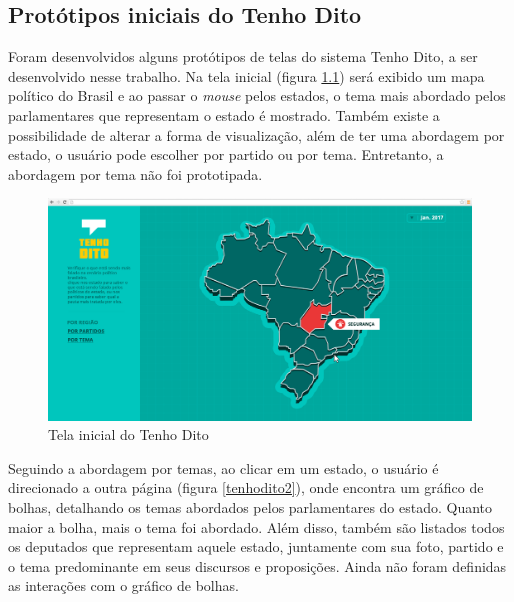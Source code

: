 \begin{apendicesenv}

\partapendices

\chapter{Protótipos iniciais do Tenho Dito}
\label{prototipos-apendice}

Foram desenvolvidos alguns protótipos de telas do sistema Tenho Dito, a ser desenvolvido nesse trabalho. Na tela inicial (figura \ref{tenhodito1}) será exibido um mapa político do Brasil e ao passar o \textit{mouse} pelos estados, o tema mais abordado pelos parlamentares que representam o estado é mostrado. Também existe a possibilidade de alterar a forma de visualização, além de ter uma abordagem por estado, o usuário pode escolher por partido ou por tema. Entretanto, a abordagem por tema não foi prototipada.

\begin{figure}[h]
  \centering
  \includegraphics[scale=0.2]{figuras/tenhodito1.eps}
  \caption{Tela inicial do Tenho Dito}
  \label{tenhodito1}
\end{figure}

Seguindo a abordagem por temas, ao clicar em um estado, o usuário é direcionado a outra página (figura \ref{tenhodito2}), onde encontra um gráfico de bolhas, detalhando os temas abordados pelos parlamentares do estado. Quanto maior a bolha, mais o tema foi abordado. Além disso, também são listados todos os deputados que representam aquele estado, juntamente com sua foto, partido e o tema predominante em seus discursos e proposições. Ainda não foram definidas as interações com o gráfico de bolhas.


\end{apendicesenv}
